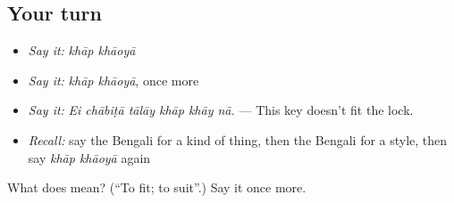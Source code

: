 \subsection*{Your turn}
\begin{itemize}
\raggedright
  \item \emph{Say it:} \emph{khāp khāoyā}
  \item \emph{Say it:} \emph{khāp khāoyā}, once more
  \item \emph{Say it:} \emph{Ei chābiṭā tālāy khāp khāy nā.} — This key doesn't fit the lock.
  \item \emph{Recall:} say the Bengali for a kind of thing, then the Bengali for a style, then say \emph{khāp khāoyā} again
\end{itemize}

\begin{tcolorbox}[breakable,colback=teal!4,colframe=teal!35!black,title={Before you move on}]
What does   mean? (\textquotedblleft{}To fit; to suit\textquotedblright{}.) Say it once more.
\end{tcolorbox}
